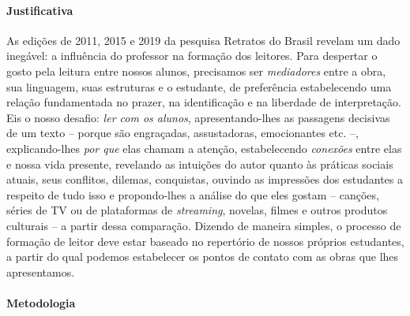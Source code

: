 \documentclass{extarticle}
\begin{document}
\paragraph{Justificativa} As edições de 2011, 2015 e 2019 da pesquisa
Retratos do Brasil revelam um dado inegável: a influência do professor
na formação dos leitores. Para despertar o gosto pela leitura entre
nossos alunos, precisamos ser \emph{mediadores} entre a obra, sua
linguagem, suas estruturas e o estudante, de preferência estabelecendo
uma relação fundamentada no prazer, na identificação e na liberdade de
interpretação. Eis o nosso desafio: \emph{ler com os alunos},
apresentando-lhes as passagens decisivas de um texto -- porque são
engraçadas, assustadoras, emocionantes etc. --, explicando-lhes
\emph{por que} elas chamam a atenção, estabelecendo \emph{conexões}
entre elas e nossa vida presente, revelando as intuições do autor quanto
às práticas sociais atuais, seus conflitos, dilemas, conquistas, ouvindo
as impressões dos estudantes a respeito de tudo isso e propondo-lhes a
análise do que eles gostam -- canções, séries de TV ou de plataformas de
\emph{streaming}, novelas, filmes e outros produtos culturais -- a
partir dessa comparação. Dizendo de maneira simples, o processo de
formação de leitor deve estar baseado no repertório de nossos próprios
estudantes, a partir do qual podemos estabelecer os pontos de contato
com as obras que lhes apresentamos.

\paragraph{Metodologia}
\end{document}
